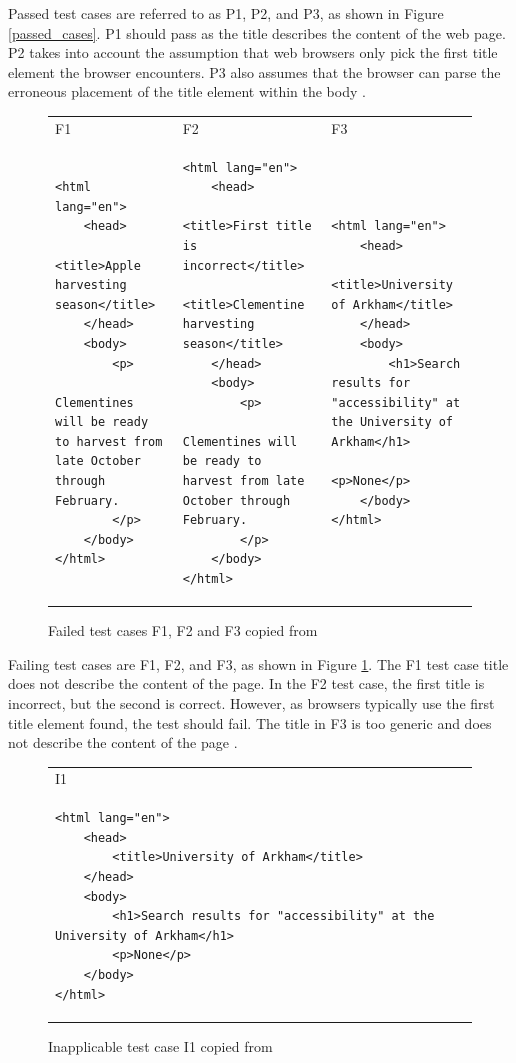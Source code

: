 Passed test cases are referred to as P1, P2, and P3, as shown in Figure \ref{passed_cases}. P1 should pass as the title describes the content of the web page. P2 takes into account the assumption that web browsers only pick the first title element the browser encounters. P3 also assumes that the browser can parse the erroneous placement of the title element within the body \citep{act_rule_g88}.


\begin{figure}[htbp]
\begin{tabular}{|p{4.9cm}|p{4.9cm}|p{4.9cm}|}
F1 & F2 & F3 \\
\begin{lstlisting}
<html lang="en">
	<head>
		<title>Apple harvesting season</title>
	</head>
	<body>
		<p>
			Clementines will be ready to harvest from late October through February.
		</p>
	</body>
</html>
\end{lstlisting}&
\begin{lstlisting}
<html lang="en">
	<head>
		<title>First title is incorrect</title>
		<title>Clementine harvesting season</title>
	</head>
	<body>
		<p>
			Clementines will be ready to harvest from late October through February.
		</p>
	</body>
</html>
\end{lstlisting}&
\begin{lstlisting}
<html lang="en">
	<head>
		<title>University of Arkham</title>
	</head>
	<body>
		<h1>Search results for "accessibility" at the University of Arkham</h1>
		<p>None</p>
	</body>
</html>
\end{lstlisting}
\end{tabular}
\caption{Failed test cases F1, F2 and F3 copied from \textcite{act_rule_g88}}
\label{failing_cases}
\end{figure}

Failing test cases are F1, F2, and F3, as shown in Figure \ref{failing_cases}. The F1 test case title does not describe the content of the page. In the F2 test case, the first title is incorrect, but the second is correct. However, as browsers typically use the first title element found, the test should fail. The title in F3 is too generic and does not describe the content of the page \citep{act_rule_g88}.

\begin{figure}
\begin{tabular}{|p{4.9cm}|}
 I1 \\
 \begin{lstlisting}
<html lang="en">
	<head>
		<title>University of Arkham</title>
	</head>
	<body>
		<h1>Search results for "accessibility" at the University of Arkham</h1>
		<p>None</p>
	</body>
</html>
\end{lstlisting}
\end{tabular}
\caption{Inapplicable test case I1 copied from \textcite{act_rule_g88}}
\label{inapplicable_case}
\end{figure}

